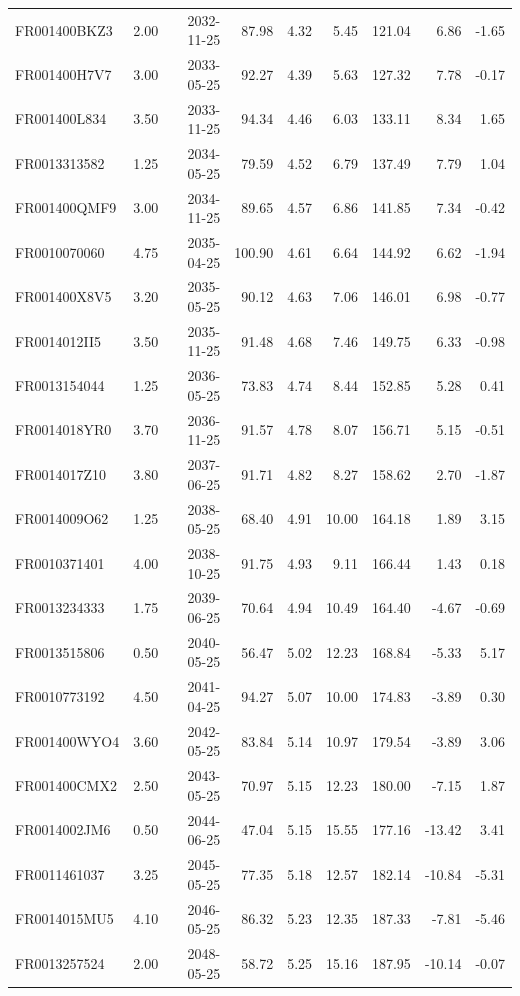 \documentclass[10pt,a4paper]{article}
\begin{document}
\begin{table}[H]
\begin{tabular}{lrrrrrrrr}
FR001400BKZ3 & 2.00 & 2032-11-25 & 87.98 & 4.32 & 5.45 & 121.04 & 6.86 & -1.65 \\
FR001400H7V7 & 3.00 & 2033-05-25 & 92.27 & 4.39 & 5.63 & 127.32 & 7.78 & -0.17 \\
FR001400L834 & 3.50 & 2033-11-25 & 94.34 & 4.46 & 6.03 & 133.11 & 8.34 & 1.65 \\
FR0013313582 & 1.25 & 2034-05-25 & 79.59 & 4.52 & 6.79 & 137.49 & 7.79 & 1.04 \\
FR001400QMF9 & 3.00 & 2034-11-25 & 89.65 & 4.57 & 6.86 & 141.85 & 7.34 & -0.42 \\
FR0010070060 & 4.75 & 2035-04-25 & 100.90 & 4.61 & 6.64 & 144.92 & 6.62 & -1.94 \\
FR001400X8V5 & 3.20 & 2035-05-25 & 90.12 & 4.63 & 7.06 & 146.01 & 6.98 & -0.77 \\
FR0014012II5 & 3.50 & 2035-11-25 & 91.48 & 4.68 & 7.46 & 149.75 & 6.33 & -0.98 \\
FR0013154044 & 1.25 & 2036-05-25 & 73.83 & 4.74 & 8.44 & 152.85 & 5.28 & 0.41 \\
FR0014018YR0 & 3.70 & 2036-11-25 & 91.57 & 4.78 & 8.07 & 156.71 & 5.15 & -0.51 \\
FR0014017Z10 & 3.80 & 2037-06-25 & 91.71 & 4.82 & 8.27 & 158.62 & 2.70 & -1.87 \\
FR0014009O62 & 1.25 & 2038-05-25 & 68.40 & 4.91 & 10.00 & 164.18 & 1.89 & 3.15 \\
FR0010371401 & 4.00 & 2038-10-25 & 91.75 & 4.93 & 9.11 & 166.44 & 1.43 & 0.18 \\
FR0013234333 & 1.75 & 2039-06-25 & 70.64 & 4.94 & 10.49 & 164.40 & -4.67 & -0.69 \\
FR0013515806 & 0.50 & 2040-05-25 & 56.47 & 5.02 & 12.23 & 168.84 & -5.33 & 5.17 \\
FR0010773192 & 4.50 & 2041-04-25 & 94.27 & 5.07 & 10.00 & 174.83 & -3.89 & 0.30 \\
FR001400WYO4 & 3.60 & 2042-05-25 & 83.84 & 5.14 & 10.97 & 179.54 & -3.89 & 3.06 \\
FR001400CMX2 & 2.50 & 2043-05-25 & 70.97 & 5.15 & 12.23 & 180.00 & -7.15 & 1.87 \\
FR0014002JM6 & 0.50 & 2044-06-25 & 47.04 & 5.15 & 15.55 & 177.16 & -13.42 & 3.41 \\
FR0011461037 & 3.25 & 2045-05-25 & 77.35 & 5.18 & 12.57 & 182.14 & -10.84 & -5.31 \\
FR0014015MU5 & 4.10 & 2046-05-25 & 86.32 & 5.23 & 12.35 & 187.33 & -7.81 & -5.46 \\
FR0013257524 & 2.00 & 2048-05-25 & 58.72 & 5.25 & 15.16 & 187.95 & -10.14 & -0.07 \\

\end{tabular}
\end{table}
\end{document}
